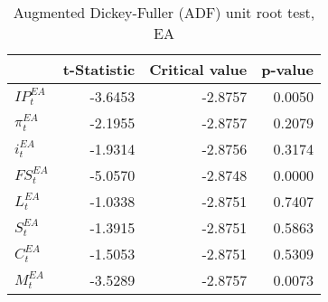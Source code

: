 


\begin{table}[ht]
    \centering
    \begin{tabular}{lrrr}
        \toprule
        {} &  t-Statistic &  Critical value &  p-value \\
        \midrule
        $IP^{EA}_{t}$  &      -3.6453 &         -2.8757 &   0.0050 \\
        $\pi^{EA}_{t}$ &      -2.1955 &         -2.8757 &   0.2079 \\
        $i^{EA}_{t}$   &      -1.9314 &         -2.8756 &   0.3174 \\
        $FS^{EA}_{t}$  &      -5.0570 &         -2.8748 &   0.0000 \\
        $L^{EA}_{t}$   &      -1.0338 &         -2.8751 &   0.7407 \\
        $S^{EA}_{t}$   &      -1.3915 &         -2.8751 &   0.5863 \\
        $C^{EA}_{t}$   &      -1.5053 &         -2.8751 &   0.5309 \\
        $M^{EA}_{t}$   &      -3.5289 &         -2.8757 &   0.0073 \\
        \bottomrule
    \end{tabular}
    \caption{Augmented Dickey-Fuller (ADF) unit root test, EA}
    \label{tab:adf_ea}
\end{table}



